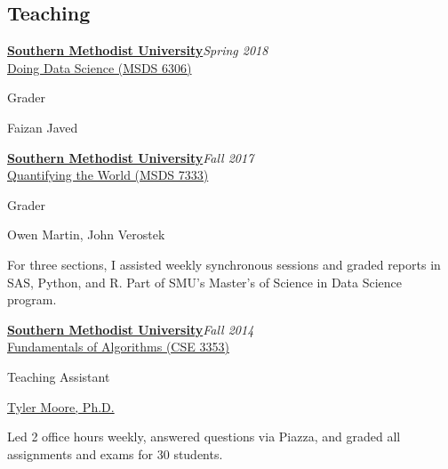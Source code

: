 \documentclass[margin, 10pt]{res} %
\newcommand{\Year}[1]{\emph{#1}}
\newcommand{\uni}[1]{\textbf{#1}}
\newcommand{\eventYear}[2]{\uni{#1}\hfill{\Year{#2}}\\}
\newcommand{\SMU}{\href{https://www.smu.edu/}{Southern Methodist University}}
\begin{document}
\begin{resume}

\section{Teaching}

\begin{samepage}
\eventYear{\SMU}{Spring 2018}
\href{https://datascience.smu.edu/academics/curriculum/coursedescriptions/#data-science}{Doing Data Science (MSDS 6306)}
\begin{description}[noitemsep, labelindent=1em]
\item[Role:] Grader
\item[Professor:] Faizan Javed
\end{description}
\end{samepage}

\begin{samepage}
\eventYear{\SMU}{Fall 2017}
\href{https://datascience.smu.edu/academics/curriculum/coursedescriptions/#quantifying}{Quantifying the World (MSDS 7333)}
\begin{description}[noitemsep, labelindent=1em]
\item[Role:] Grader
\item[Professor:] Owen Martin, John Verostek
\item For three sections, I assisted weekly synchronous sessions and graded reports in SAS, Python, and R. Part of SMU's Master's of Science in Data Science program.
\end{description}
\end{samepage}

\begin{samepage}
\eventYear{\SMU}{Fall 2014}
\href{https://tylermoore.ens.utulsa.edu/courses/cse3353/}{Fundamentals of Algorithms (CSE 3353)}
\begin{description}[noitemsep, labelindent=1em]
\item[Role:] Teaching Assistant
\item[Professor:] \href{https://tylermoore.ens.utulsa.edu}{Tyler Moore, Ph.D.}
\item Led 2 office hours weekly, answered questions via Piazza, and graded all assignments and exams for 30 students.
\end{description}
\end{samepage}


\end{resume}
\end{document}
